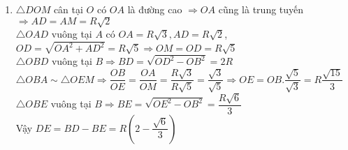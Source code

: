 \begin{ex}
{\begin{enumerate}
    	$\Rightarrow OD$ là đường trung trực của đoạn thẳng $BF$\\
    	$OD\perp BF$ tại $H$
    	$\Rightarrow \triangle OHI\sim \triangle OAD$(g-g)\\
    	$\Rightarrow \dfrac{OH}{OA}=\dfrac{OI}{OD}\Rightarrow OI.OA=OH.OD$\\
    	$\triangle OBD$ vuông tại $B$ có đường cao $BH\Rightarrow OH.OD=OB^2=R^2$\\
    	$\Rightarrow OI.OA=R^2\Rightarrow OI=\dfrac{R^2}{OA}$\hspace{1cm}(1)\\
    	Ta có đường tròn $(O,R)$ và đường thẳng $d$ cố định nên đoạn thẳng $OA$ cố định và có độ dài không đổi \hspace{1cm}(2)\\
    	Từ $(1)$ và $(2)\Rightarrow $ khoảng cách $OI$ không đổi và $I$ thuộc $OA$ cố định.\\Suy ra $I$ cố định\\
    	Do đó đường thẳng $BF$ luôn đi qua một điểm $I$ cố định khi $M$ di động trên $d$
    	\item $\triangle DOM$ cân tại $O$ có $OA$ là đường cao $\Rightarrow OA$ cũng là trung tuyến $\Rightarrow AD=AM=R\sqrt{2}$\\
    	$\triangle OAD$ vuông tại $A$ có $OA=R\sqrt{3},AD=R\sqrt{2}$, $OD=\sqrt{OA^2+AD^2}=R\sqrt{5}\Rightarrow OM=OD=R\sqrt{5}$\\
    	$\triangle OBD$ vuông tại $B\Rightarrow BD=\sqrt{OD^2-OB^2}=2R$\\
    	$\triangle OBA\sim \triangle OEM\Rightarrow \dfrac{OB}{OE}=\dfrac{OA}{OM}=\dfrac{R\sqrt{3}}{R\sqrt{5}}=\dfrac{\sqrt{3}}{\sqrt{5}}\Rightarrow OE=OB.\dfrac{\sqrt{5}}{\sqrt{3}}=R\dfrac{\sqrt{15}}{3}$\\
    	$\triangle OBE$ vuông tại $B\Rightarrow BE=\sqrt{OE^2-OB^2}=\dfrac{R\sqrt{6}}{3}$\\
    	Vậy $DE=BD-BE=R\left(2-\dfrac{\sqrt{6}}{3}\right)$
    	
    	\end{enumerate}

    }
\end{ex}

